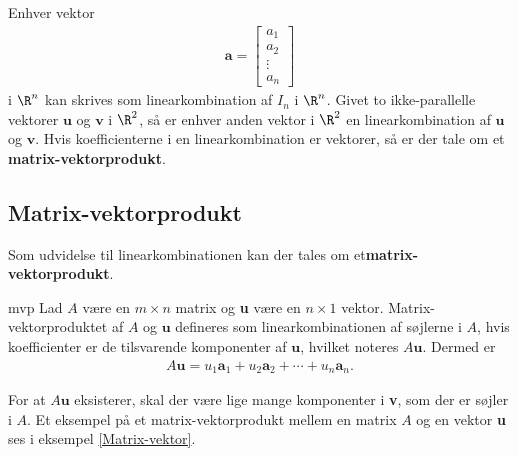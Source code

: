%
%
Enhver vektor 
\begin{align*}
\textbf{a}=
\begin{bmatrix}
a_1 \\
a_2 \\
\vdots \\
a_n
\end{bmatrix}
\end{align*}
%
i $\R^n$ kan skrives som linearkombination af $I_n$ i $\R^n$. 
Givet to ikke-parallelle vektorer $\mathbf{u}$ og $\mathbf{v}$ i $\R^2$, så er enhver anden vektor i $\R^2$ en linearkombination af $\mathbf{u}$ og $\mathbf{v}$. 
Hvis koefficienterne i en linearkombination er vektorer, så er der tale om et \textbf{matrix-vektorprodukt}.
%
%
%
%
\subsection{Matrix-vektorprodukt}
%
Som udvidelse til linearkombinationen kan der tales om et\textbf{matrix-vektorprodukt}.
%
%
\begin{defn}{}{mvp}
Lad $A$ være en $m \times n$ matrix og \textbf{u} være en $n \times 1$ vektor. 
Matrix-vektorproduktet af $A$ og $\textbf{u}$ defineres som linearkombinationen af søjlerne i $A$, hvis koefficienter er de tilsvarende komponenter af $\textbf{u}$, hvilket noteres $A\textbf{u}$. 
Dermed er
\begin{align*}
A\textbf{u} =u_1\textbf{a}_1 + u_2\textbf{a}_2 + \cdots + u_n\textbf{a}_n.
\end{align*}
\end{defn}
\noindent
For at $A\textbf{u}$ eksisterer, skal der være lige mange komponenter i \textbf{v}, som der er søjler i $A$. 
Et eksempel på et matrix-vektorprodukt mellem en matrix $A$ og en vektor \textbf{u} ses i eksempel \ref{Matrix-vektor}.
\\
%
